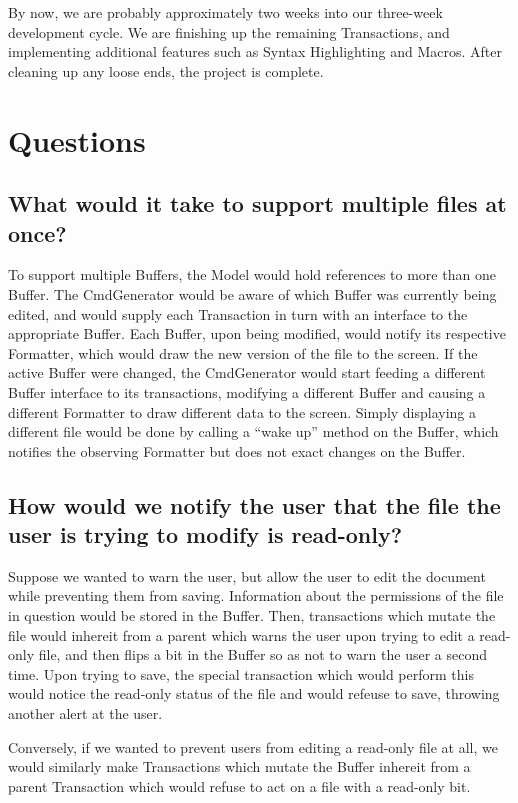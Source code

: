 \documentclass[12pt]{article}
\begin{document}
By now, we are probably approximately two weeks into our three-week development cycle. We are finishing up
the remaining Transactions, and implementing additional features such as Syntax Highlighting and Macros.
After cleaning up any loose ends, the project is complete.

\section{Questions}

\subsection{What would it take to support multiple files at once?}

To support multiple Buffers, the Model would hold references to more than one Buffer. The CmdGenerator would
be aware of which Buffer was currently being edited, and would supply each Transaction in turn with an interface
to the appropriate Buffer. Each Buffer, upon being modified, would notify its respective Formatter, which would
draw the new version of the file to the screen. If the active Buffer were changed, the CmdGenerator would start
feeding a different Buffer interface to its transactions, modifying a different Buffer and causing a different
Formatter to draw different data to the screen. Simply displaying a different file would be done by calling a
``wake up'' method on the Buffer, which notifies the observing Formatter but does not exact changes on the Buffer.

\subsection{How would we notify the user that the file the user is trying to modify is read-only?}

Suppose we wanted to warn the user, but allow the user to edit the document while preventing them from saving.
Information about the permissions of the file in question would be stored in the Buffer.
Then, transactions which mutate the file would inhereit from a parent which warns the user
upon trying to edit a read-only file, and then flips a bit in the Buffer so as not to warn the user a second time.
Upon trying to save, the special transaction which would perform this would notice the read-only status of the
file and would refeuse to save, throwing another alert at the user.

Conversely, if we wanted to prevent users from editing a read-only file at all, we would similarly make
Transactions which mutate the Buffer inhereit from a parent Transaction which would refuse to act on a file
with a read-only bit.
\end{document}
